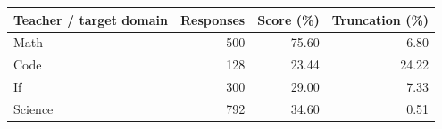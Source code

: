 \begin{tabular}{lrrr}
\toprule
Teacher / target domain & Responses & Score (\%) & Truncation (\%) \\
\midrule
Math & 500 & 75.60 & 6.80 \\
Code & 128 & 23.44 & 24.22 \\
If & 300 & 29.00 & 7.33 \\
Science & 792 & 34.60 & 0.51 \\
\bottomrule
\end{tabular}
